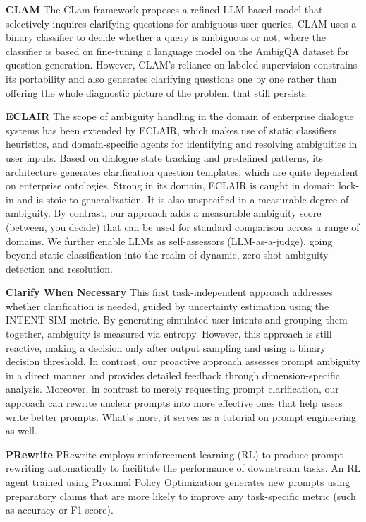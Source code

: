 \documentclass[conference]{IEEEtran}
\begin{document}
\textbf{CLAM} \parencite{kuhn2023clamselectiveclarificationambiguous}
The CLam framework proposes a refined LLM-based model that selectively inquires clarifying questions for ambiguous user queries. CLAM uses a binary classifier to decide whether a query is ambiguous or not, where the classifier is based on fine-tuning a language model on the AmbigQA dataset for question generation. However, CLAM's reliance on labeled supervision constrains its portability and also generates clarifying questions one by one rather than offering the whole diagnostic picture of the problem that still persists.

\textbf{ECLAIR} \parencite{murzaku2025eclairenhancedclarificationinteractive}
The scope of ambiguity handling in the domain of enterprise dialogue systems has been extended by ECLAIR, which makes use of static classifiers, heuristics, and domain-specific agents for identifying and resolving ambiguities in user inputs. Based on dialogue state tracking and predefined patterns, its architecture generates clarification question templates, which are quite dependent on enterprise ontologies. Strong in its domain, ECLAIR is caught in domain lock-in and is stoic to generalization. It is also unspecified in a measurable degree of ambiguity. By contrast, our approach adds a measurable ambiguity score (between, you decide) that can be used for standard comparison across a range of domains. We further enable LLMs as self-assessors (LLM-as-a-judge), going beyond static classification into the realm of dynamic, zero-shot ambiguity detection and resolution.

\textbf{Clarify When Necessary} \parencite{zhang2023clarifynecessaryresolvingambiguity}
This first task-independent approach addresses whether clarification is needed, guided by uncertainty estimation using the INTENT-SIM metric. By generating simulated user intents and grouping them together, ambiguity is measured via entropy. However, this approach is still reactive, making a decision only after output sampling and using a binary decision threshold. In contrast, our proactive approach assesses prompt ambiguity in a direct manner and provides detailed feedback through dimension-specific analysis. Moreover, in contrast to merely requesting prompt clarification, our approach can rewrite unclear prompts into more effective ones that help users write better prompts. What’s more, it serves as a tutorial on prompt engineering as well.

\textbf{PRewrite} \parencite{kong2024prewritepromptrewritingreinforcement}
PRewrite employs reinforcement learning (RL) to produce prompt rewriting automatically to facilitate the performance of downstream tasks. An RL agent trained using Proximal Policy Optimization generates new prompts using preparatory claims that are more likely to improve any task-specific metric (such as accuracy or F1 score).
\end{document}
